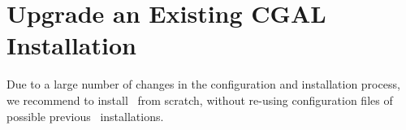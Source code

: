 \section{Upgrade an Existing CGAL Installation\label{sec:upgrade}}

Due to a large number of changes in the configuration and installation
process, we recommend to install \cgal\ from scratch, without re-using
configuration files of possible previous \cgal\ installations.







